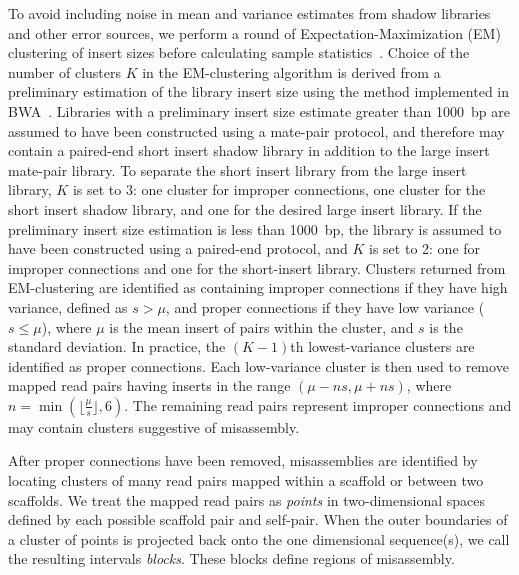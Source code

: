 \documentclass[10pt]{article}
\begin{document}
To avoid including noise in mean and variance estimates from shadow libraries and other error sources, 
we perform a round of Expectation-Maximization (EM) clustering of insert sizes before calculating sample statistics~\cite{GuptaChen2010}. 
Choice of the number of clusters $K$ in
the EM-clustering algorithm is derived from a preliminary estimation of the library insert size using the method implemented in
BWA~\cite{bwa}. Libraries with a preliminary
insert size estimate greater than 1000~bp are assumed to have been constructed using a mate-pair protocol, and therefore
may contain a paired-end short insert shadow library in addition to the large insert mate-pair library. To separate the short insert library
from the large insert library, $K$ is set to 3: one cluster for improper connections, one cluster for the short insert
shadow library, and one for the desired large insert library. If the preliminary insert size estimation is less than 1000~bp, the library
is assumed to have been constructed using a paired-end protocol, and $K$ is set to 2: one for improper connections
and one for the short-insert library. Clusters returned from EM-clustering are identified as containing improper connections if 
they have high variance, defined as $s > \mu$, and proper connections if they have low variance ($s \le \mu$), where $\mu$ is the mean insert of pairs within
the cluster, and $s$ is the standard deviation. In practice, the $(K-1)$th lowest-variance clusters are identified as proper connections.
Each low-variance cluster is then used to remove mapped read pairs 
having inserts in the range $(\mu-ns,\mu+ns)$, where $n = \min(\lfloor\frac{\mu}{s}\rfloor, 6)$.  The remaining read
pairs represent improper connections and may contain clusters suggestive of misassembly.


After proper connections have been removed, misassemblies are identified by locating clusters of many read pairs mapped within
a scaffold or between two scaffolds. We treat the mapped read pairs as \emph{points} in
two-dimensional spaces defined by each possible scaffold pair and self-pair. When the outer boundaries of a cluster of points
is projected back onto the one dimensional sequence(s), we call the resulting intervals \emph{blocks}.
These blocks define regions of misassembly.
\end{document}
